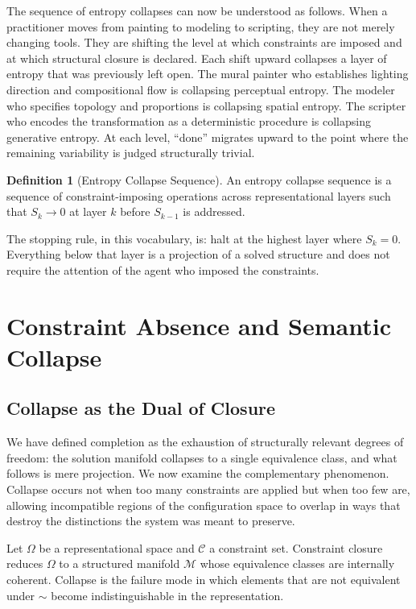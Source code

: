 \documentclass[11pt, twoside]{article}
\theoremstyle{plain}
\theoremstyle{definition}
\newtheorem{definition}[theorem]{Definition}
\theoremstyle{remark}
\begin{document}
The sequence of entropy collapses can now be understood as follows. When a practitioner moves from painting to modeling to scripting, they are not merely changing tools. They are shifting the level at which constraints are imposed and at which structural closure is declared. Each shift upward collapses a layer of entropy that was previously left open. The mural painter who establishes lighting direction and compositional flow is collapsing perceptual entropy. The modeler who specifies topology and proportions is collapsing spatial entropy. The scripter who encodes the transformation as a deterministic procedure is collapsing generative entropy. At each level, ``done'' migrates upward to the point where the remaining variability is judged structurally trivial.

\begin{definition}[Entropy Collapse Sequence]
An entropy collapse sequence is a sequence of constraint-imposing operations across representational layers such that $S_k \to 0$ at layer $k$ before $S_{k-1}$ is addressed.
\end{definition}

The stopping rule, in this vocabulary, is: halt at the highest layer where $S_k = 0$. Everything below that layer is a projection of a solved structure and does not require the attention of the agent who imposed the constraints.

\section{Constraint Absence and Semantic Collapse}
\label{sec:collapse}

\subsection{Collapse as the Dual of Closure}

We have defined completion as the exhaustion of structurally relevant degrees of freedom: the solution manifold collapses to a single equivalence class, and what follows is mere projection. We now examine the complementary phenomenon. Collapse occurs not when too many constraints are applied but when too few are, allowing incompatible regions of the configuration space to overlap in ways that destroy the distinctions the system was meant to preserve.

Let $\Omega$ be a representational space and $\mathcal{C}$ a constraint set. Constraint closure reduces $\Omega$ to a structured manifold $\mathcal{M}$ whose equivalence classes are internally coherent. Collapse is the failure mode in which elements that are not equivalent under $\sim$ become indistinguishable in the representation.
\end{document}
